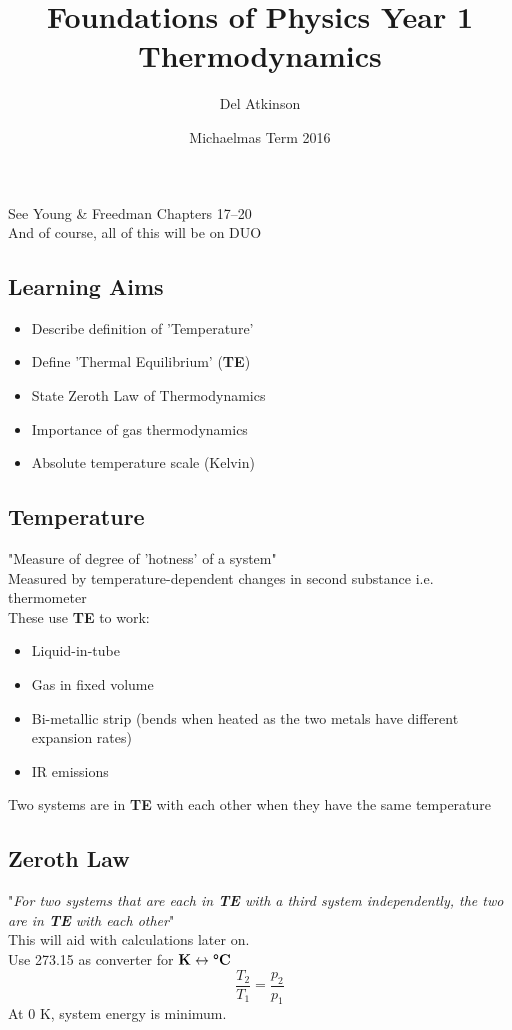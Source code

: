 \documentclass[a4paper, 11pt, fleqn, normalem]{report}
\title{Foundations of Physics Year 1 \\ Thermodynamics \vspace{-20pt}}
\author{Del Atkinson}
\date{\vspace{-15pt}Michaelmas Term 2016}
\begin{document}
\maketitle
\thispagestyle{fancy}

\tableofcontents

\chapter{}
\thispagestyle{fancy}
See Young \& Freedman Chapters 17--20 \\
And of course, all of this will be on DUO
\section{Learning Aims}
\begin{itemize}
    \item Describe definition of 'Temperature'
    \item Define 'Thermal Equilibrium' (\textbf{TE})
    \item State Zeroth Law of Thermodynamics
    \item Importance of gas thermodynamics
    \item Absolute temperature scale (Kelvin)
\end{itemize}

\section{Temperature}
"Measure of degree of 'hotness' of a system" \\
Measured by temperature-dependent changes in second substance i.e. thermometer \\
These use \textbf{TE} to work:
\begin{itemize}
    \item Liquid-in-tube
    \item Gas in fixed volume
    \item Bi-metallic strip (bends when heated as the two metals have different expansion rates)
    \item IR emissions
\end{itemize}
Two systems are in \textbf{TE} with each other when they have the same temperature

\section{Zeroth Law}
"\textit{For two systems that are each in \textbf{TE} with a third system independently, the two are in \textbf{TE} with each other}" \\
This will aid with calculations later on. \\
Use 273.15 as converter for $\textbf{K}\leftrightarrow\textbf{{\textdegree}C}$
\begin{equation*}
    \dfrac{T_{2}}{T_{1}} = \dfrac{p_{2}}{p_{1}}
\end{equation*}
At 0 K, system energy is minimum.
\end{document}
